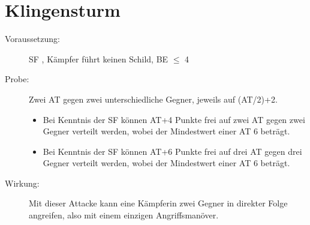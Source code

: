 \section{Klingensturm}
\label{bAT.klingensturm}
\begin{description}
    \item[Voraussetzung:]
        SF , Kämpfer führt keinen Schild, BE\textrm{ ${\leq}$ }4
    \item[Probe:]
        Zwei AT gegen zwei unterschiedliche Gegner, jeweils auf (AT/2)+2.
        \begin{itemize}
            \item Bei Kenntnis der SF  können AT+4 Punkte frei auf zwei AT gegen zwei Gegner verteilt werden, wobei der Mindestwert einer AT 6 beträgt.
            \item Bei Kenntnis der SF  können AT+6 Punkte frei auf drei AT gegen drei Gegner verteilt werden, wobei der Mindestwert einer AT 6 beträgt.
        \end{itemize}
    \item[Wirkung:]
        Mit dieser Attacke kann eine Kämpferin zwei Gegner in direkter Folge angreifen, also mit einem einzigen Angriffsmanöver.
\end{description}
